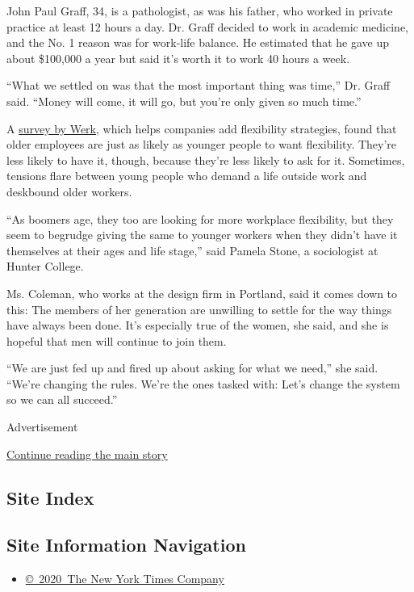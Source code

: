 John Paul Graff, 34, is a pathologist, as was his father, who worked in
private practice at least 12 hours a day. Dr. Graff decided to work in
academic medicine, and the No. 1 reason was for work-life balance. He
estimated that he gave up about \$100,000 a year but said it's worth it
to work 40 hours a week.

``What we settled on was that the most important thing was time,'' Dr.
Graff said. ``Money will come, it will go, but you're only given so much
time.''

A \href{https://werk.co/research}{survey by Werk}, which helps companies
add flexibility strategies, found that older employees are just as
likely as younger people to want flexibility. They're less likely to
have it, though, because they're less likely to ask for it. Sometimes,
tensions flare between young people who demand a life outside work and
deskbound older workers.

``As boomers age, they too are looking for more workplace flexibility,
but they seem to begrudge giving the same to younger workers when they
didn't have it themselves at their ages and life stage,'' said Pamela
Stone, a sociologist at Hunter College.

Ms. Coleman, who works at the design firm in Portland, said it comes
down to this: The members of her generation are unwilling to settle for
the way things have always been done. It's especially true of the women,
she said, and she is hopeful that men will continue to join them.

``We are just fed up and fired up about asking for what we need,'' she
said. ``We're changing the rules. We're the ones tasked with: Let's
change the system so we can all succeed.''

Advertisement

\protect\hyperlink{after-bottom}{Continue reading the main story}

\hypertarget{site-index}{%
\subsection{Site Index}\label{site-index}}

\hypertarget{site-information-navigation}{%
\subsection{Site Information
Navigation}\label{site-information-navigation}}

\begin{itemize}
\tightlist
\item
  \href{https://help.nytimes.com/hc/en-us/articles/115014792127-Copyright-notice}{©~2020~The
  New York Times Company}
\end{itemize}

